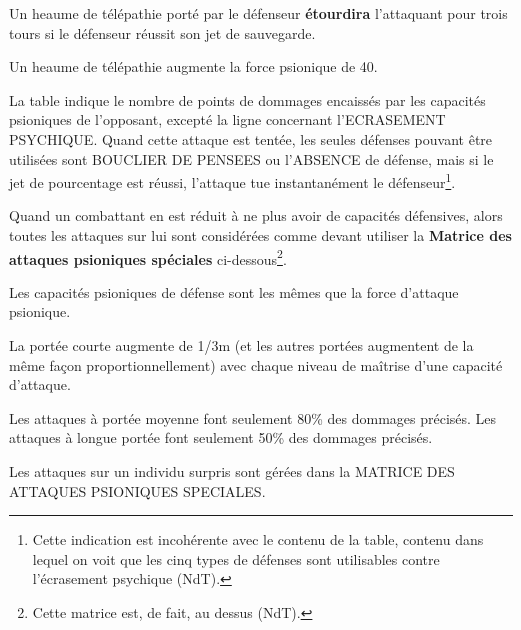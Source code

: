 {\begin{tabular}{cl>{\centering\arraybackslash}p{2cm}>{\centering\arraybackslash}p{2cm}>{\centering\arraybackslash}p{2cm}>{\centering\arraybackslash}p{2cm}>{\centering\arraybackslash}p{2cm}}
\end{tabular}

\newpage

Un heaume de télépathie porté par le défenseur \textbf{étourdira} l'attaquant pour trois tours si le défenseur réussit son jet de sauvegarde.

\bigskip

Un heaume de télépathie augmente la force psionique de 40.

\bigskip

La table indique le nombre de points de dommages encaissés par les capacités psioniques de l'opposant, excepté la ligne concernant l'ECRASEMENT PSYCHIQUE. Quand cette attaque est tentée, les seules défenses pouvant être utilisées sont BOUCLIER DE PENSEES ou l'ABSENCE de défense, mais si le jet de pourcentage est réussi, l'attaque tue instantanément le défenseur\footnote{Cette indication est incohérente avec le contenu de la table, contenu dans lequel on voit que les cinq types de défenses sont utilisables contre l'écrasement psychique (NdT).}.

\bigskip

Quand un combattant en est réduit à ne plus avoir de capacités défensives, alors toutes les attaques sur lui sont considérées comme devant utiliser la \textbf{Matrice des attaques psioniques spéciales} ci-dessous\footnote{Cette matrice est, de fait, au dessus (NdT).}.

\bigskip

Les capacités psioniques de défense sont les mêmes que la force d'attaque psionique.

\bigskip

La portée courte augmente de 1/3m (et les autres portées augmentent de la même façon proportionnellement) avec chaque niveau de maîtrise d'une capacité d'attaque.

\bigskip

Les attaques à portée moyenne font seulement 80\% des dommages précisés. Les attaques à longue portée font seulement 50\% des dommages précisés.

\bigskip

Les attaques sur un individu surpris sont gérées dans la MATRICE DES ATTAQUES PSIONIQUES SPECIALES.

\bigskip

}

